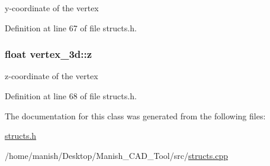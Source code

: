 y-\/coordinate of the vertex 



Definition at line 67 of file structs.\+h.

\subsubsection[{\texorpdfstring{z}{z}}]{\setlength{\rightskip}{0pt plus 5cm}float vertex\+\_\+3d\+::z}\hypertarget{classvertex__3d_a9028d1e6317552f63d6cbd57ff5a42ba}{}\label{classvertex__3d_a9028d1e6317552f63d6cbd57ff5a42ba}


z-\/coordinate of the vertex 



Definition at line 68 of file structs.\+h.



The documentation for this class was generated from the following files\+:\begin{DoxyCompactItemize}
\item 
\hyperlink{structs_8h}{structs.\+h}\item 
/home/manish/\+Desktop/\+Manish\+\_\+\+C\+A\+D\+\_\+\+Tool/src/\hyperlink{structs_8cpp}{structs.\+cpp}\end{DoxyCompactItemize}
